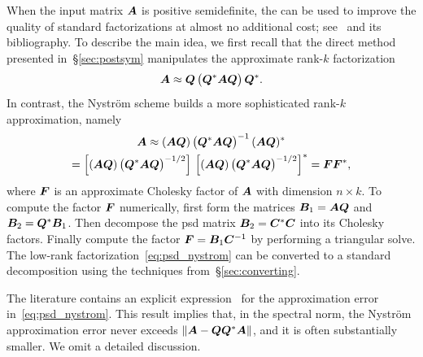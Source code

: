 \documentclass[final]{siamltex}
\newcommand{\pgnotate}[1]{{\color{blue}[#1]}}
\begin{document}
When the input matrix $\bm{A}$ is positive semidefinite, the
 can be used to improve
the quality of standard factorizations at almost no additional cost;
see~\cite{DM05:Nystrom-Method} and its bibliography.
To describe the main idea, we first recall that the direct method presented
in~\S\ref{sec:postsym} manipulates the approximate rank-$k$ factorization
\begin{equation}
\label{eq:psd_standard}
\mtx{A} \approx \mtx{Q}\,\bigl(\mtx{Q}^{\adj}\mtx{A}\mtx{Q}\bigr)\,\mtx{Q}^{\adj}.
\end{equation}
In contrast, the Nystr\"{o}m scheme builds a more sophisticated rank-$k$ approximation, namely
\begin{multline}
\label{eq:psd_nystrom}
\mtx{A}
\approx (\mtx{A}\mtx{Q})\,\bigl(\mtx{Q}^{\adj}\mtx{A}\mtx{Q}\bigr)^{-1}\,(\mtx{A}\mtx{Q})^{\adj}\\
= \left[(\mtx{A}\mtx{Q})\,\bigl(\mtx{Q}^{\adj}\mtx{A}\mtx{Q}\bigr)^{-1/2}\right]\,
  \left[(\mtx{A}\mtx{Q})\,\bigl(\mtx{Q}^{\adj}\mtx{A}\mtx{Q}\bigr)^{-1/2}\right]^{\adj}
= \mtx{FF}^\adj,
\end{multline}
where $\bm{F}$ is an approximate Cholesky factor of $\bm{A}$ with dimension $n\times k$.
To compute the factor $\bm{F}$ numerically, first form the matrices
$\bm{B}_1 = \bm{AQ}$ and $\bm{B}_2 = \bm{Q}^* \bm{B}_1$.
Then decompose the psd matrix $\bm{B}_2 = \bm{C}^* \bm{C}$
into its Cholesky factors.  Finally compute the factor $\bm{F} = \bm{B}_1 \bm{C}^{-1}$
by performing a triangular solve. The low-rank factorization~\eqref{eq:psd_nystrom} can be
converted to a standard decomposition using the techniques from~\S\ref{sec:converting}.


The literature contains an explicit expression~\cite[Lem.~4]{DM05:Nystrom-Method} for the approximation error in~\eqref{eq:psd_nystrom}.  This result implies that, in the spectral norm, the Nystr{\"o}m approximation error never exceeds $\left\Vert { \bm{A} - \bm{QQ}^*\bm{A} } \right\Vert$, and it is often substantially smaller.  We omit a detailed discussion.

%
\end{document}
